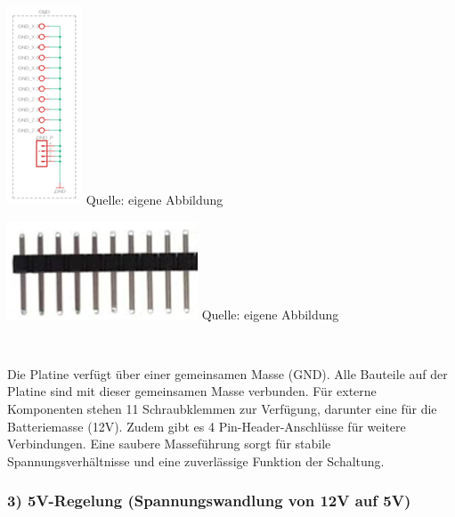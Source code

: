 \documentclass[ngerman,12pt,a4paper]{article}
\begin{document}
			\begin{center}
			\begin{minipage}{0.4\linewidth}
				\centering
				\includegraphics{Pictures/Schaltplan-masse}
				\label{fig:Schaltplan Masseanschlüsse}
				\small Quelle: eigene Abbildung
			\end{minipage}
			\hfill
			\begin{minipage}{0.5\linewidth}
				\centering
				\includegraphics{Pictures/pinheader}
				\label{fig:Pinheader}
				\small Quelle: eigene Abbildung
			\end{minipage} \\[0.75cm]
			\end{center} 
			Die Platine verfügt über einer gemeinsamen Masse (GND). Alle Bauteile auf der Platine sind mit dieser gemeinsamen Masse verbunden. Für externe Komponenten stehen 11 Schraubklemmen zur Verfügung, darunter eine für die Batteriemasse (12V). Zudem gibt es 4 Pin-Header-Anschlüsse für weitere Verbindungen. Eine saubere Masseführung sorgt für stabile Spannungsverhältnisse und eine zuverlässige Funktion der Schaltung.
			\subsubsection*{3) 5V-Regelung (Spannungswandlung von 12V auf 5V)}
			
\end{document}
